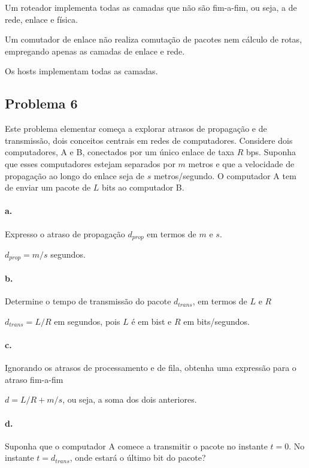 Um roteador implementa todas as camadas que não são fim-a-fim, ou seja, a de rede, enlace e física.

Um comutador de enlace não realiza comutação de pacotes nem cálculo de rotas, empregando apenas as camadas de enlace e rede.

Os hosts implementam todas as camadas.

\subsection{Problema 6}

Este problema elementar começa a explorar atrasos de propagação e de transmissão, dois conceitos centrais em redes de computadores. Considere dois computadores, A e B, conectados por um único enlace de taxa $R$ bps. Suponha que esses computadores estejam separados por $m$ metros e que a velocidade de propagação ao longo do enlace seja de $s$ metros/segundo. O computador A tem de enviar um pacote de $L$ bits ao computador B.

\paragraph{a.} Expresso o atraso de propagação $d_{prop}$ em termos de $m$ e $s$.

$d_{prop} = m/s$ segundos.

\paragraph{b.} Determine o tempo de transmissão do pacote $d_{trans}$, em termos de $L$ e $R$

$d_{trans} = L/R$ em segundos, pois $L$ é em bist e $R$ em bits/segundos.

\paragraph{c.} Ignorando os atrasos de processamento e de fila, obtenha uma expressão para o atraso fim-a-fim

$d = L/R + m/s$, ou seja, a soma dos dois anteriores.

\paragraph{d.} Suponha que o computador A comece a transmitir o pacote no instante $t = 0$. No instante $t = d_{trans}$, onde estará o último bit do pacote?

